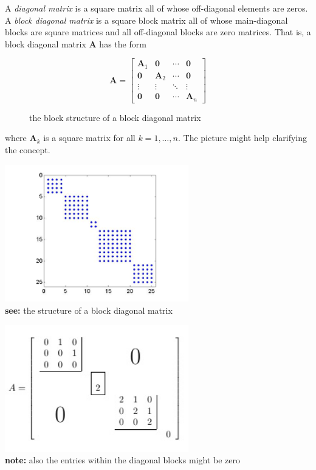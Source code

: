 \renewcommand{\nomebreve}{block\_diag\_mat}
\renewcommand{\titolo}{Detecting blocks in a matrix}

\introduzione{}

\noindent
A \emph{diagonal matrix} is a square matrix all of whose off-diagonal elements are zeros. A \emph{block diagonal matrix} is a square block matrix all of whose main-diagonal blocks are square matrices and all off-diagonal blocks are zero matrices.  That is, a block diagonal matrix $\mathbf{A}$ has the form

\begin{figure}[!h]
\[
\mathbf{A} = \begin{bmatrix} 
  \mathbf{A}_1 & \mathbf{0}    & \cdots & \mathbf{0}   \\
  \mathbf{0}   & \mathbf{A}_2  & \cdots & \mathbf{0}   \\
  \vdots       & \vdots        & \ddots & \vdots       \\
  \mathbf{0}   & \mathbf{0}    & \cdots & \mathbf{A}_n
\end{bmatrix}
\]
  \label{fig:block_structure}
  \caption{the block structure of a block diagonal matrix}
\end{figure}

where $\mathbf{A}_k$ is a square matrix for all $k = 1, \ldots, n$.
The picture might help clarifying the concept.
\begin{table}[!h]
  \begin{minipage}{.5\textwidth}
    \centering
    \includegraphics[width=0.60\textwidth]{figures/block_diag_mat_gen_example.png}\\
    {\bf see:} the structure of a block diagonal matrix
  \end{minipage}%
  \begin{minipage}{.5\textwidth}
    \centering
    \includegraphics[width=0.60\textwidth]{figures/block_diag_mat_one_example_with_structure_highlighted.png}\\
    {\bf note:} also the entries within the diagonal blocks might be zero
    \end{minipage}
\end{table}

